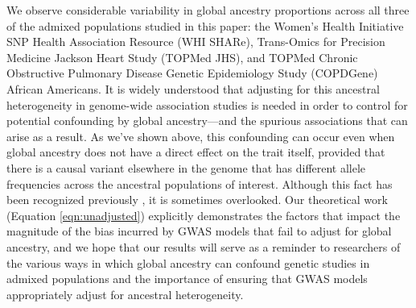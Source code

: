 \documentclass[12pt]{article}
\begin{document}
We observe considerable variability in global ancestry proportions across all three of the admixed populations studied in this paper: the Women's Health Initiative SNP Health Association Resource (WHI SHARe), Trans-Omics for Precision Medicine Jackson Heart Study (TOPMed JHS), and TOPMed Chronic Obstructive Pulmonary Disease Genetic Epidemiology Study (COPDGene) African Americans.
It is widely understood that adjusting for this ancestral heterogeneity in genome-wide association studies is needed in order to control for potential confounding by global ancestry---and the spurious associations that can arise as a result. %
As we've shown above, this confounding can occur even when global ancestry does not have a direct effect on the trait itself, provided that there is a causal variant elsewhere in the genome that has different allele frequencies across the ancestral populations of interest. %
Although this fact has been recognized previously \citep{wacholder2002}, it is sometimes overlooked. 
Our theoretical work (Equation \ref{eqn:unadjusted}) explicitly demonstrates the factors that impact the magnitude of the bias incurred by GWAS models that fail to adjust for global ancestry, and we hope that our results will serve as a reminder to researchers of the various ways in which global ancestry can confound genetic studies in admixed populations and the importance of ensuring that GWAS models appropriately adjust for ancestral heterogeneity.
\end{document}
